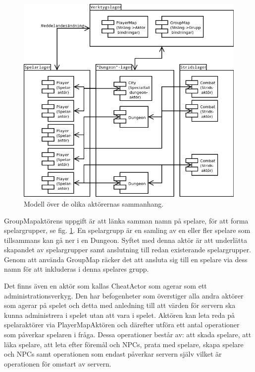 \documentclass[a4paper]{article}
\begin{document}
\begin{figure}[hbt]
\centering
\includegraphics[width=1.0\textwidth]{serverActorModel2-2}
\caption{\label{fig:ServerActorModel}Modell över de olika aktörernas sammanhang.}
\end{figure}

GroupMapaktörens uppgift är att länka samman namn på spelare, för att forma spelargrupper, se fig. \ref{fig:ServerActorModel}. En spelargrupp är en samling av en eller fler spelare som tillsammans kan gå ner i en Dungeon. Syftet med denna aktör är att underlätta skapandet av spelargrupper samt anslutning till redan existerande spelargrupper. Genom att använda GroupMap räcker det att ansluta sig till en spelare via dess namn för att inkluderas i denna spelares grupp.

Det finns även en aktör som kallas CheatActor som agerar som ett administrationsverkyg. Den har befogenheter som överstiger alla andra aktörer som agerar på spelet och detta med anledning till att värden för servern ska kunna administrera i spelet utan att vara i spelet. Aktören kan leta reda på spelaraktörer via PlayerMapAktören och därefter utföra ett antal operationer som påverkar spelaren i fråga. Dessa operationer består av: att skada spelare, att läka spelare, att leta efter föremål och NPCs, prata med spelare, skapa spelare och NPCs samt operationen som endast påverkar servern själv vilket är operationen för omstart av servern. 
\end{document}
